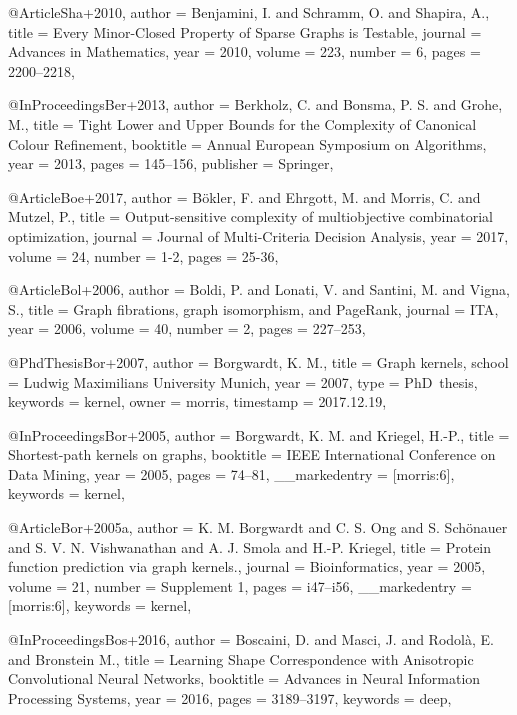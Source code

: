@Article{Sha+2010,
  author  = {Benjamini, I. and Schramm, O. and Shapira, A.},
  title   = {Every Minor-Closed Property of Sparse Graphs is Testable},
  journal = {Advances in Mathematics},
  year    = {2010},
  volume  = {223},
  number  = {6},
  pages   = {2200--2218},
}

@InProceedings{Ber+2013,
  author    = {Berkholz, C. and Bonsma, P. S. and Grohe, M.},
  title     = {Tight Lower and Upper Bounds for the Complexity of Canonical Colour Refinement},
  booktitle = {Annual European Symposium on Algorithms},
  year      = {2013},
  pages     = {145--156},
  publisher = {Springer},
}

@Article{Boe+2017,
  author  = {Bökler, F. and Ehrgott, M. and Morris, C. and Mutzel, P.},
  title   = {Output-sensitive complexity of multiobjective combinatorial optimization},
  journal = {Journal of Multi-Criteria Decision Analysis},
  year    = {2017},
  volume  = {24},
  number  = {1-2},
  pages   = {25-36},
}

@Article{Bol+2006,
  author  = {Boldi, P. and Lonati, V. and Santini, M. and Vigna, S.},
  title   = {Graph fibrations, graph isomorphism, and PageRank},
  journal = {{ITA}},
  year    = {2006},
  volume  = {40},
  number  = {2},
  pages   = {227--253},
}

@PhdThesis{Bor+2007,
  author    = {Borgwardt, K. M.},
  title     = {Graph kernels},
  school    = {Ludwig Maximilians University Munich},
  year      = {2007},
  type      = {PhD~thesis},
  keywords  = {kernel},
  owner     = {morris},
  timestamp = {2017.12.19},
}

@InProceedings{Bor+2005,
  author        = {Borgwardt, K. M. and Kriegel, H.-P.},
  title         = {Shortest-path kernels on graphs},
  booktitle     = {IEEE International Conference on Data Mining},
  year          = {2005},
  pages         = {74--81},
  __markedentry = {[morris:6]},
  keywords      = {kernel},
}

@Article{Bor+2005a,
  author        = {K. M. Borgwardt and C. S. Ong and S. Sch\"onauer and S. V. N. Vishwanathan and A. J. Smola and H.-P. Kriegel},
  title         = {Protein function prediction via graph kernels.},
  journal       = {Bioinformatics},
  year          = {2005},
  volume        = {21},
  number        = {Supplement 1},
  pages         = {i47--i56},
  __markedentry = {[morris:6]},
  keywords      = {kernel},
}

@InProceedings{Bos+2016,
  author    = {Boscaini, D. and Masci, J. and Rodol{\`{a}}, E. and Bronstein M.},
  title     = {Learning Shape Correspondence with Anisotropic Convolutional Neural Networks},
  booktitle = {Advances in Neural Information Processing Systems},
  year      = {2016},
  pages     = {3189--3197},
  keywords  = {deep},
}

